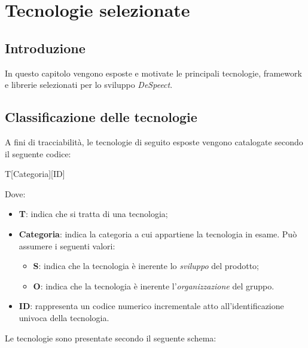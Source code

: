 \documentclass[./../Technology Baseline.tex]{subfiles}
\begin{document}
	
\chapter{Tecnologie selezionate}
	
\section{Introduzione}
In questo capitolo vengono esposte e motivate le principali tecnologie, framework e librerie selezionati per lo sviluppo \textit{DeSpeect}.

\section{Classificazione delle tecnologie}

A fini di tracciabilità, le tecnologie di seguito esposte vengono catalogate secondo il seguente codice:

\begin{center}
	T[Categoria][ID]
\end{center}

Dove:

\begin{itemize}
	\item \textbf{T}: indica che si tratta di una tecnologia;
	\item \textbf{Categoria}: indica la categoria a cui appartiene la tecnologia in esame. Può assumere i seguenti valori:
		\begin{itemize}
			\item \textbf{S}: indica che la tecnologia è inerente lo \textit{sviluppo} del prodotto;
			\item \textbf{O}: indica che la tecnologia è inerente l'\textit{organizzazione} del gruppo.
		\end{itemize}
	\item \textbf{ID}: rappresenta un codice numerico incrementale atto all'identificazione univoca della tecnologia.
\end{itemize}

\noindent Le tecnologie sono presentate secondo il seguente schema: 
\end{document}

